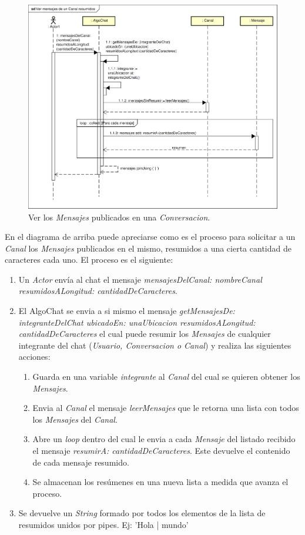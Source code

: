 \documentclass[titlepage,a4paper]{article}
\begin{document}
\begin{figure}[H]
	\centering
	\includegraphics[width=1\textwidth]{diagrama_secuencia02.png}
	\caption{\label{fig:seq02}Ver los \textit{Mensajes} publicados en una \textit{Conversacion}.}
\end{figure}

En el diagrama de arriba puede apreciarse como es el proceso para solicitar a un \textit{Canal} los \textit{Mensajes} publicados en el mismo, resumidos a una cierta cantidad de caracteres cada uno. El proceso es el siguiente:

\begin{enumerate}
	\item Un \textit{Actor} envía al chat el mensaje \textit{mensajesDelCanal: nombreCanal resumidosALongitud: cantidadDeCaracteres}.
	\item El AlgoChat se envia a si mismo el mensaje \textit{getMensajesDe: integranteDelChat ubicadoEn: unaUbicacion resumidosALongitud: cantidadDeCaracteres} el cual puede resumir los\textit{ Mensajes} de cualquier integrante del chat (\textit{Usuario, Conversacion o Canal}) y realiza las siguientes acciones:
	\begin{enumerate}
		\item Guarda en una variable \textit{integrante} al \textit{Canal} del cual se quieren obtener los \textit{Mensajes}.
		\item Envia al \textit{Canal} el mensaje \textit{leerMensajes} que le retorna una lista con todos los \textit{Mensajes} del \textit{Canal}.
		\item Abre un \textit{loop} dentro del cual le envia a cada \textit{Mensaje} del listado recibido el mensaje \textit{resumirA: cantidadDeCaracteres}. Este devuelve el contenido de cada mensaje resumido.
		\item Se almacenan los resúmenes en una nueva lista a medida que avanza el proceso.
	\end{enumerate}
	\item Se devuelve un \textit{String} formado por todos los elementos de la lista de resumidos unidos por pipes. Ej: 'Hola | mundo' 
\end{enumerate}
\end{document}

